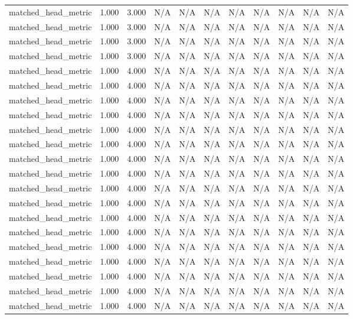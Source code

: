\begin{table}[h!]
\begin{tabular}{lrrrrrrrrrr}
matched\_head\_metric & 1.000 & 3.000 & N/A & N/A & N/A & N/A & N/A & N/A & N/A & N/A \\
matched\_head\_metric & 1.000 & 3.000 & N/A & N/A & N/A & N/A & N/A & N/A & N/A & N/A \\
matched\_head\_metric & 1.000 & 3.000 & N/A & N/A & N/A & N/A & N/A & N/A & N/A & N/A \\
matched\_head\_metric & 1.000 & 3.000 & N/A & N/A & N/A & N/A & N/A & N/A & N/A & N/A \\
matched\_head\_metric & 1.000 & 4.000 & N/A & N/A & N/A & N/A & N/A & N/A & N/A & N/A \\
matched\_head\_metric & 1.000 & 4.000 & N/A & N/A & N/A & N/A & N/A & N/A & N/A & N/A \\
matched\_head\_metric & 1.000 & 4.000 & N/A & N/A & N/A & N/A & N/A & N/A & N/A & N/A \\
matched\_head\_metric & 1.000 & 4.000 & N/A & N/A & N/A & N/A & N/A & N/A & N/A & N/A \\
matched\_head\_metric & 1.000 & 4.000 & N/A & N/A & N/A & N/A & N/A & N/A & N/A & N/A \\
matched\_head\_metric & 1.000 & 4.000 & N/A & N/A & N/A & N/A & N/A & N/A & N/A & N/A \\
matched\_head\_metric & 1.000 & 4.000 & N/A & N/A & N/A & N/A & N/A & N/A & N/A & N/A \\
matched\_head\_metric & 1.000 & 4.000 & N/A & N/A & N/A & N/A & N/A & N/A & N/A & N/A \\
matched\_head\_metric & 1.000 & 4.000 & N/A & N/A & N/A & N/A & N/A & N/A & N/A & N/A \\
matched\_head\_metric & 1.000 & 4.000 & N/A & N/A & N/A & N/A & N/A & N/A & N/A & N/A \\
matched\_head\_metric & 1.000 & 4.000 & N/A & N/A & N/A & N/A & N/A & N/A & N/A & N/A \\
matched\_head\_metric & 1.000 & 4.000 & N/A & N/A & N/A & N/A & N/A & N/A & N/A & N/A \\
matched\_head\_metric & 1.000 & 4.000 & N/A & N/A & N/A & N/A & N/A & N/A & N/A & N/A \\
matched\_head\_metric & 1.000 & 4.000 & N/A & N/A & N/A & N/A & N/A & N/A & N/A & N/A \\
matched\_head\_metric & 1.000 & 4.000 & N/A & N/A & N/A & N/A & N/A & N/A & N/A & N/A \\
matched\_head\_metric & 1.000 & 4.000 & N/A & N/A & N/A & N/A & N/A & N/A & N/A & N/A \\
matched\_head\_metric & 1.000 & 4.000 & N/A & N/A & N/A & N/A & N/A & N/A & N/A & N/A \\

\end{tabular}
\end{table}
